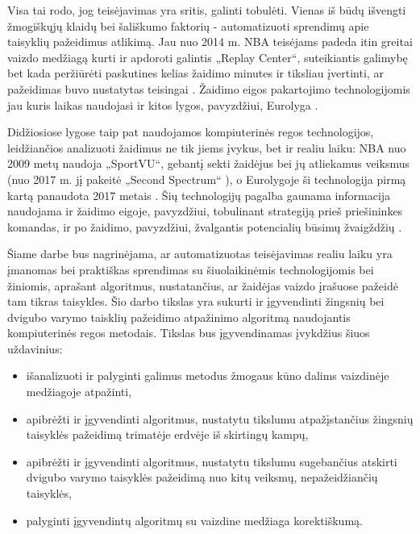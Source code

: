 \documentclass{VUMIFPSbakalaurinis}
\begin{document}
Visa tai rodo, jog teisėjavimas yra sritis, galinti tobulėti. Vienas iš būdų išvengti žmogiškųjų klaidų bei šališkumo faktorių - automatizuoti sprendimų apie taisyklių pažeidimus atlikimą. Jau nuo 2014 m. NBA teisėjams padeda itin greitai vaizdo medžiagą kurti ir apdoroti galintis „Replay Center“, suteikiantis galimybę bet kada peržiūrėti paskutines kelias žaidimo minutes ir tiksliau įvertinti, ar pažeidimas buvo nustatytas teisingai \cite{NBAReplay}. Žaidimo eigos pakartojimo technologijomis jau kuris laikas naudojasi ir kitos lygos, pavyzdžiui, Eurolyga \cite{EuroleagueReplay}.

Didžiosiose lygose taip pat naudojamos kompiuterinės regos technologijos, leidžiančios analizuoti žaidimus ne tik jiems įvykus, bet ir realiu laiku: NBA nuo 2009 metų naudoja „SportVU“, gebantį sekti žaidėjus bei jų atliekamus veiksmus {\cite{NBAStatsVu}} (nuo 2017 m. jį pakeitė „Second Spectrum“ {\cite{SecondSpectrum})}, o Eurolygoje ši technologija pirmą kartą panaudota 2017 metais {\cite{EuroleagueStats}}. Šių technologijų pagalba gaunama informacija naudojama ir žaidimo eigoje, pavyzdžiui, tobulinant strategiją prieš priešininkes komandas, ir po žaidimo, pavyzdžiui, žvalgantis potencialių būsimų žvaigždžių {\cite{THOMAS20173}}.

Šiame darbe bus nagrinėjama, ar automatizuotas teisėjavimas realiu laiku yra įmanomas bei praktiškas sprendimas su šiuolaikinėmis technologijomis bei žiniomis, aprašant algoritmus, nustatančius, ar žaidėjas vaizdo įrašuose pažeidė tam tikras taisykles. Šio darbo tikslas yra sukurti ir įgyvendinti žingsnių bei dvigubo varymo taisklių pažeidimo atpažinimo algoritmą naudojantis kompiuterinės regos metodais. Tikslas bus įgyvendinamas įvykdžius šiuos uždavinius:

\begin{itemize}
	\item išanalizuoti ir palyginti galimus metodus žmogaus kūno dalims vaizdinėje medžiagoje atpažinti,
	\item apibrėžti ir įgyvendinti algoritmus, nustatytu tikslumu atpažįstančius žingsnių taisyklės pažeidimą
	trimatėje erdvėje iš skirtingų kampų,
	\item apibrėžti ir įgyvendinti algoritmus, nustatytu tikslumu sugebančius atskirti dvigubo varymo
	taisyklės pažeidimą nuo kitų veiksmų, nepažeidžiančių taisyklės,
	\item palyginti įgyvendintų algoritmų su vaizdine medžiaga korektiškumą.
\end{itemize}
\end{document}
